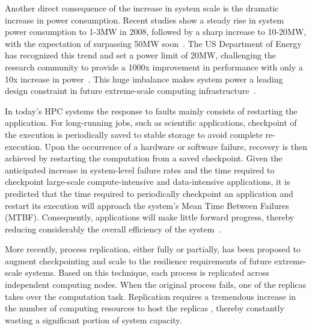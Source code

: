 Another direct consequence of the increase in system scale is the dramatic increase in power consumption. Recent studies show a steady rise in system power consumption to 1-3MW in 2008, followed by a sharp increase to 10-20MW, with the expectation of surpassing 50MW soon~\cite{doe_ascr_exascale_2011}. The US Department of Energy has recognized this trend and set a power limit of 20MW, challenging the research community to provide a 1000x improvement in performance with only a 10x increase in power~\cite{doe_ascr_exascale_2011}. %
This huge imbalance makes system power a leading design constraint in future extreme-scale computing infrastructure~\cite{Sarood2014}.%


In today's HPC systems the response to faults mainly consists of restarting the application. 
For long-running jobs, such as scientific applications, %
checkpoint of the execution is periodically saved to stable storage to avoid complete re-execution.
Upon the occurrence of a hardware or software failure, recovery is then achieved by restarting the computation from a saved checkpoint. Given the anticipated increase in system-level failure rates and the time required to checkpoint large-scale compute-intensive and data-intensive applications, it is predicted that the time required to periodically checkpoint an application and restart its execution will approach the system's Mean Time Between Failures (MTBF). Consequently, applications will make little forward progress, thereby reducing considerably the overall efficiency of the system~\cite{ferreira_sc_2011}.%

More recently, process replication, either fully or partially, has been proposed to augment checkpointing and scale to the resilience requirements of future extreme-scale systems. %
Based on this technique, each process is replicated across independent computing
nodes. When the original process fails, one of the replicas takes over the computation task. Replication 
requires a tremendous increase in the number of computing resources to host the replicas%
, thereby constantly wasting a significant portion of system capacity. 

